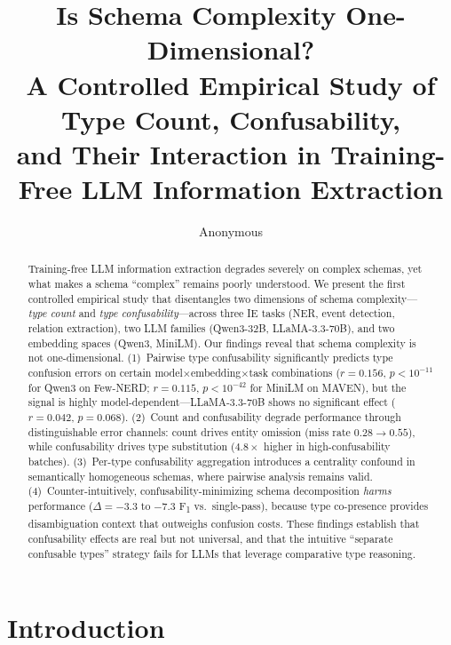 \documentclass[11pt,a4paper]{article}
\title{Is Schema Complexity One-Dimensional?\\A Controlled Empirical Study of Type Count, Confusability,\\and Their Interaction in Training-Free LLM Information Extraction}
\author{Anonymous}
\date{}
\begin{document}
\maketitle

\begin{abstract}

Training-free LLM information extraction degrades severely on complex schemas, yet what makes a schema ``complex'' remains poorly understood.
We present the first controlled empirical study that disentangles two dimensions of schema complexity---\emph{type count} and \emph{type confusability}---across three IE tasks (NER, event detection, relation extraction), two LLM families (Qwen3-32B, LLaMA-3.3-70B), and two embedding spaces (Qwen3, MiniLM).
Our findings reveal that schema complexity is not one-dimensional.
(1)~Pairwise type confusability significantly predicts type confusion errors on certain model$\times$embedding$\times$task combinations ($r{=}0.156$, $p{<}10^{-11}$ for Qwen3 on Few-NERD; $r{=}0.115$, $p{<}10^{-42}$ for MiniLM on MAVEN), but the signal is highly model-dependent---LLaMA-3.3-70B shows no significant effect ($r{=}0.042$, $p{=}0.068$).
(2)~Count and confusability degrade performance through distinguishable error channels: count drives entity omission (miss rate $0.28{\to}0.55$), while confusability drives type substitution ($4.8{\times}$ higher in high-confusability batches).
(3)~Per-type confusability aggregation introduces a centrality confound in semantically homogeneous schemas, where pairwise analysis remains valid.
(4)~Counter-intuitively, confusability-minimizing schema decomposition \emph{harms} performance ($\Delta{=}{-}3.3$ to ${-}7.3$ F\textsubscript{1} vs.\ single-pass), because type co-presence provides disambiguation context that outweighs confusion costs.
These findings establish that confusability effects are real but not universal, and that the intuitive ``separate confusable types'' strategy fails for LLMs that leverage comparative type reasoning.

\end{abstract}

\section{Introduction}
\label{sec:intro}
\end{document}
